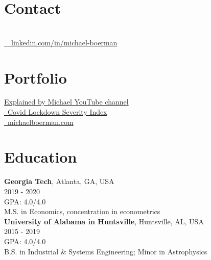 \documentclass[margin,line]{res}
\begin{document}

\begin{resume}
\section{\sc Contact}

 \\
\faLinkedinIn  \href{https://www.linkedin.com/in/michael-boerman}{\ttfamily \, \, linkedin.com/in/michael-boerman}\\
\vspace{-.35cm}



\section{\sc Portfolio}
 \href{https://www.youtube.com/channel/UCxFMrMb6PrS7SOrQi-BfMUw/videos?view=0&sort=p&flow=grid}{ Explained by Michael YouTube channel}\\
\faChartLine \href{https://github.com/michaelboerman/lockdown_severity_index#readme}{\, Covid Lockdown Severity Index}\\
\faBriefcase \href{https://michaelboerman.com/}{\ttfamily  \, michaelboerman.com}\\


\vspace{-.35cm}
\section{\sc Education}
{\bf Georgia Tech}, Atlanta, GA, USA\\
2019 - 2020\\
GPA: 4.0/4.0\\
M.S. in Economics, concentration in econometrics\\

\vspace{-.35cm}
{\bf University of Alabama in Huntsville}, Huntsville, AL, USA\\
2015 - 2019\\
GPA: 4.0/4.0\\
B.S. in Industrial \& Systems Engineering; Minor in Astrophysics\\

\vspace{-.35cm}

\end{resume}
\end{document}
